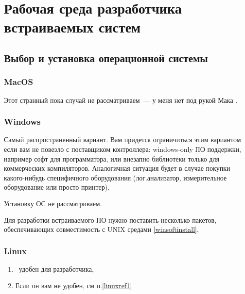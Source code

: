 \chapter{Рабочая среда разработчика встраиваемых систем}


\section{Выбор и установка операционной системы}

\subsection{MacOS}

Этот странный пока случай не рассматриваем\ --- у меня нет под рукой Мака \smiley.

\subsection{Windows}

Самый распространенный вариант. Вам придется ограничиться этим вариантом если вам не повезло
с поставщиком контроллера: windows-only ПО поддержки, например софт для программатора, или
внезапно библиотеки только для коммерческих компиляторов. Аналогичная ситуация будет в случае
покупки какого-нибудь специфичного оборудования (лог.анализатор, измерительное 
оборудование или просто принтер).

Установку ОС не рассматриваем.


Для разработки встраиваемого ПО нужно поставить несколько пакетов, обеспечивающих
совместимость с UNIX средами \ref{winsoftinstall}.

\subsection{Linux}\label{linux}

\begin{enumerate}
\item \label{linuxref1}\linux\ удобен для разработчика, 
\item Если он вам не удобен, см п.\ref{linuxref1}
\end{enumerate}


